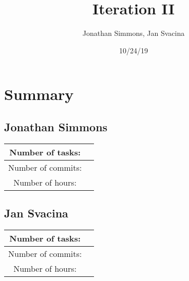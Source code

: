 \documentclass{article}
\title{Iteration II}
\date{10/24/19}
\author{Jonathan Simmons, Jan Svacina}
\begin{document}
    \maketitle




    \section*{Summary}

    \subsection*{Jonathan Simmons}

    \begin{center}
        \begin{tabular}{||c c ||}
            \hline
            Number of tasks: &  \\
            \hline
            Number of commits: &  \\
            \hline
            Number of hours: &  \\
            \hline
        \end{tabular}
    \end{center}

    \subsection*{Jan Svacina}

    \begin{center}
        \begin{tabular}{||c c ||}
            \hline
            Number of tasks: &  \\
            \hline
            Number of commits: &  \\
            \hline
            Number of hours: &  \\
            \hline
        \end{tabular}
    \end{center}
\end{document}
